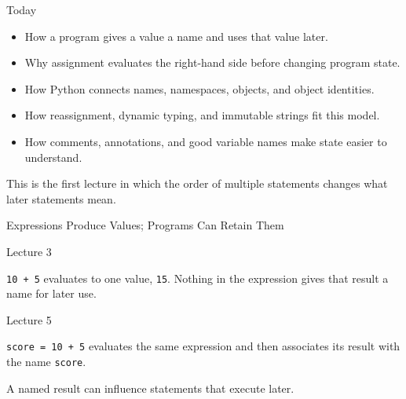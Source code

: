 \documentclass[aspectratio=169,10pt]{beamer}
\begin{document}
\makedecktitle

\begin{frame}{Today}

  \begin{itemize}

    \item How a program gives a value a name and uses that value later.

    \item Why assignment evaluates the right-hand side before changing program state.

    \item How Python connects names, namespaces, objects, and object identities.

    \item How reassignment, dynamic typing, and immutable strings fit this model.

    \item How comments, annotations, and good variable names make state easier to understand.

  \end{itemize}

  \begin{keyidea}

    This is the first lecture in which the order of multiple statements changes what later statements mean.

  \end{keyidea}

\end{frame}


\begin{frame}{Expressions Produce Values; Programs Can Retain Them}

      \begin{block}{Lecture 3}

        \texttt{10 + 5} evaluates to one value, \texttt{15}. Nothing in the expression gives that result a name for later use.

      \end{block}

      \begin{block}{Lecture 5}

        \texttt{score = 10 + 5} evaluates the same expression and then associates its result with the name \texttt{score}.

      \end{block}

  \begin{keyidea}

    A named result can influence statements that execute later.

  \end{keyidea}

\end{frame}
\end{document}
